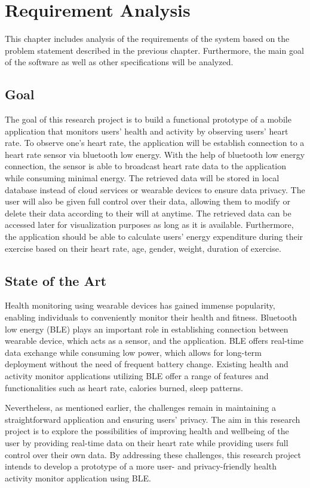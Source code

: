 \chapter{Requirement Analysis}
This chapter includes analysis of the requirements of the system based on the problem statement described in the previous chapter. Furthermore, the main goal of the software as well as other specifications will be analyzed.

\section{Goal}
The goal of this research project is to build a functional prototype of a mobile application that monitors users' health and activity by observing users' heart rate. To observe one's heart rate, the application will be establish connection to a heart rate sensor via bluetooth low energy.
With the help of bluetooth low energy connection, the sensor is able to broadcast heart rate data to the application while consuming minimal energy.
The retrieved data will be stored in local database instead of cloud services or wearable devices to ensure data privacy. The user will also be given full control over their data, allowing them to modify or delete their data according to their will at anytime.
The retrieved data can be accessed later for visualization purposes as long as it is available. Furthermore, the application should be able to calculate users' energy expenditure during their exercise based on their heart rate, age, gender, weight, duration of exercise.

\section{State of the Art}
Health monitoring using wearable devices has gained immense popularity, enabling individuals to conveniently monitor their health and fitness. Bluetooth low energy (BLE) plays an important role in establishing connection between wearable device, which acts as a sensor, and the application. 
BLE offers real-time data exchange while consuming low power, which allows for long-term deployment without the need of frequent battery change. \cite{strey2013ble}
Existing health and activity monitor applications utilizing BLE offer a range of features and functionalities such as heart rate, calories burned, sleep patterns.

Nevertheless, as mentioned earlier, the challenges remain in maintaining a straightforward application and ensuring users' privacy. The aim in this research project is to explore the possibilities of improving health and wellbeing of the user by providing real-time data on their heart rate while providing users full control over their own data.
By addressing these challenges, this research project intends to develop a prototype of a more user- and privacy-friendly health activity monitor application using BLE.
\newpage


